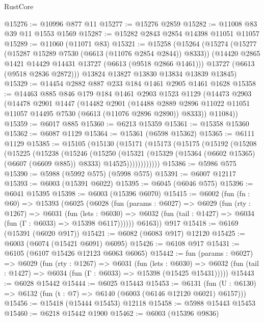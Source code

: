 \begin{lexlean}{RustCore}
\begin{coremodule}
@15276 := @10996 @877 @11
@15277 := @15276 @2859
@15282 := @11008 @83 @39 @11 @1553 @1569
@15287 := @15282 @2843 @2854 @14398 @11051 @11057
@15289 := @11060 (@11071 @83)
@15321 := @15258
    (@15264
      (@15274
        (@15277 (@15287 @15289 @7530 (@6613 (@11076 @2854 @2844)) @8333))
        (@14420 @2865 @1421 @14429 @14431 @13727 (@6613 (@9518 @2866 @1461)))
        @13727
        (@6613 (@9518 @2836 @2872)))
      @13824
      @13827
      @13830
      @13834
      @13839
      @13845)
@15329 := @14454 @2882 @887 @233 @184 @1461 @2905 @1461 @1628
@15358 := @14463
    @885
    @846
    @179
    @184
    @1461
    @2903
    @1523
    @1129
    (@14473
      @2903
      (@14478
        @2901
        @1447
        (@14482
          @2901
          (@14488 @2889 @2896 @11022 @11051 @11057 @14495 @7530 (@6613 (@11076 @2896 @2890)) @8333))
        @11084))
@15359 := @6017 @885
@15360 := @6213 @15359
@15361 := @15358 @15360
@15362 := @6087 @1129
@15364 := @15361 (@6598 @15362)
@15365 := @6111 @1129
@15385 := @15105
    (@15130
      (@15171
        (@15173
          (@15175
            (@15192
              (@15208
                (@15225
                  (@15238
                    (@15246
                      (@15250
                        (@15321
                          (@15329
                            (@15364 (@6602 @15365) (@6607 (@6609 @885)) @8333)
                            @14525))))))))))))
@15386 := @5986 @575
@15390 := @5988 (@5992 @575) (@5998 @575)
@15391 := @6007 @12117
@15393 := @6003 (@15391 @6022)
@15395 := @6045 (@6046 @575)
@15396 := @6041 @15395
@15398 := @6003 (@15396 @6070)
@15415 := @6002
    (fun (fn : @60) =>
    @15393
      (@6025
        (@6028
          (fun (params : @6027) =>
          @6029
            (fun (rty : @1267) =>
            @6031
              (fun (lets : @6030) =>
              @6032 (fun (tail : @1427) => @6034 (fun (Γ : @6033) => @15398 @6117))))))
        @6163))
    @917
@15418 := @6169 (@15391 (@6020 @917))
@15421 := @6082 (@6083 @917) @12120
@15425 := @6003 (@6074 (@15421 @6091) @6095)
@15426 := @6108 @917
@15431 := @6105 (@6107 @15426 @12123 @6063 @6065)
@15442 := fun (params : @6027) =>
  @6029
    (fun (rty : @1267) =>
    @6031
      (fun (lets : @6030) =>
      @6032 (fun (tail : @1427) => @6034 (fun (Γ : @6033) => @15398 (@15425 @15431)))))
@15443 := @6028 @15442
@15444 := @6025 @15443
@15453 := @6131
    (fun (U : @6130) => @6132 (fun (t : @7) => @6140 (@6003 (@6146 @12120 @6021) @6157)))
@15456 := @15418 (@15444 @15453) @12118
@15458 := @5988 @15443 @15453
@15460 := @6218 @15442 @1900
@15462 := @6003 (@15396 @9836)

\end{coremodule}
\end{lexlean}
